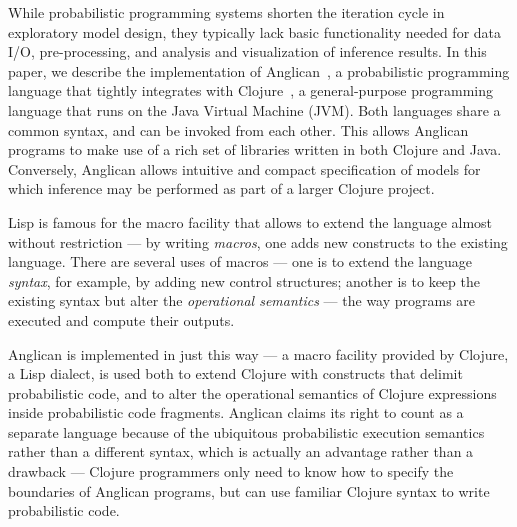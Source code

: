 \documentclass[preprint]{sigplanconf}
\begin{document}
While probabilistic programming systems shorten the iteration cycle in
exploratory model design, they typically lack basic functionality needed for
data I/O, pre-processing, and analysis and visualization of inference results.
In this paper, we describe the implementation of
Anglican~\cite{TMW15, Anglican}, a probabilistic
programming language that tightly integrates with
Clojure~\cite{H08,Clojure}, a general-purpose programming language
that runs on the Java Virtual Machine (JVM). Both languages share a common
syntax, and can be invoked from each other. This allows Anglican programs to
make use of a rich set of libraries written in both Clojure and Java.
Conversely, Anglican allows intuitive and compact specification of models for
which inference may be performed as part of a larger Clojure project.

\iftoggle{full}{%
There are several ways to build a programming language
on top of or besides another language.  The easiest is an
interpreter --- a program that reads a program, in its entirety
or line-by-line, and executes it by applying operational
semantics of a certain kind to the language. \textsc{Basic} is
famous for line-by-line interpreted implementations.

Another approach is to write a compiler, either to a virtual
architecture, so called p-code or byte-code, or to real
hardware. Here, the whole program is translated from the
`higher-level' source language to a `lower-level' object
language, which can be directly executed, either by hardware or
by an interpreter --- but the latter interpreter can be made
simpler and more efficient  than an interpreter for the source
language.

On top of these two approaches are methods in which a new
language is implemented `inside' another language of the same
level of abstraction. Different languages provide different
means for this; }{%
There are several ways to build a new language on top of an
existing one;
}%
Lisp is famous for the macro facility
that allows to extend the language almost without
restriction --- by writing \textit{macros}, one adds new
constructs to the existing language. There are several uses of
macros --- one is to extend the language \textit{syntax}, for
example, by adding new control structures; another is to keep
the existing syntax but alter the \textit{operational semantics}
--- the way programs are executed and compute their outputs.

Anglican is implemented in just this way --- a macro facility
provided by Clojure, a Lisp dialect, is used both to extend
Clojure with constructs that delimit probabilistic code, and to
alter the operational semantics of Clojure expressions inside
probabilistic code fragments. Anglican claims its right to count
as a separate language because of the ubiquitous probabilistic
execution semantics rather than a different syntax,
which is actually an advantage rather than a drawback ---
Clojure programmers only need to know how to specify the
boundaries of Anglican programs, but can use familiar Clojure
syntax to write probabilistic code.
\end{document}
